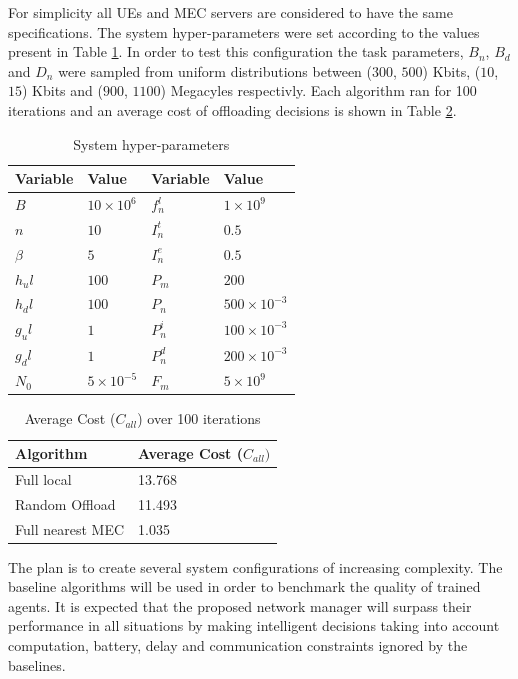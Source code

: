 For simplicity all \acrshort{UE}s and \acrshort{MEC} servers are considered to have the same specifications. The system hyper-parameters were set according to the values present in Table \ref{hyperparams}. In order to test this configuration the task parameters, $B_n$, $B_d$ and $D_n$ were sampled from uniform distributions between ($300$, $500$) Kbits, ($10$, $15$) Kbits and ($900$, $1100$) Megacyles respectivly. Each algorithm ran for 100 iterations and an average cost of offloading decisions is shown in Table \ref{resultstest1}.


\begin{table}[h]
\centering
\begin{tabular}{|l|l|l|l|}
\hline
Variable             & Value & Variable                & Value \\ \hline
$B$&$10\times10^{6}$&$f_n^l$&$1\times10^{9}$\\
$n$&$10$&$I_n^t$&$0.5$\\
$\beta$&$5$&$I_n^e$&$0.5$\\
$h_ul$&$100$& $P_m$&$200$\\
$h_dl$&$100$& $P_n$& $500\times10^{-3}$\\
$g_ul$&$1$&$P_n^i$&$100\times10^{-3}$\\
$g_dl$&$1$&$P_n^d$&$200\times10^{-3}$\\
$N_0$&$5\times10^{-5}$&$F_m$&$5\times10^{9}$\\ \hline
\end{tabular}
\caption{System hyper-parameters}\label{hyperparams}
\end{table}

\begin{table}[h]
\centering
\begin{tabular}{|l|l|}
\hline
Algorithm        & Average Cost ($C_{all})$ \\ \hline
Full local       & 13.768\\
Random Offload   & 11.493\\
Full nearest MEC & 1.035\\ \hline
\end{tabular}
\caption{Average Cost ($C_{all}$) over 100 iterations} \label{resultstest1}
\end{table}

The plan is to create several system configurations of increasing complexity. The baseline algorithms will be used in order to benchmark the quality of trained agents. It is expected that the proposed network manager will surpass their performance in all situations by making intelligent decisions taking into account computation, battery, delay and communication constraints ignored by the baselines.